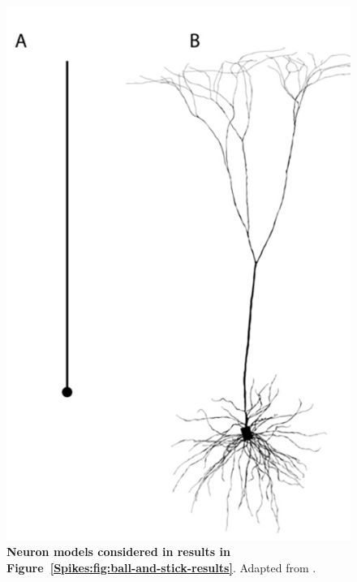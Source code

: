 \begin{figure}[!ht]
\begin{center}
\includegraphics{Figures/Spikes/Spikes-ball-and-stick-neuron-models-w43-r300}
\end{center}
\caption[]{\textbf{Neuron models considered in results in Figure~\ref{Spikes:fig:ball-and-stick-results}}. 
Adapted from \citet{Pettersen2008}.
}
\label{Spikes:fig:ball-and-stick-neuron-models}
\end{figure}

